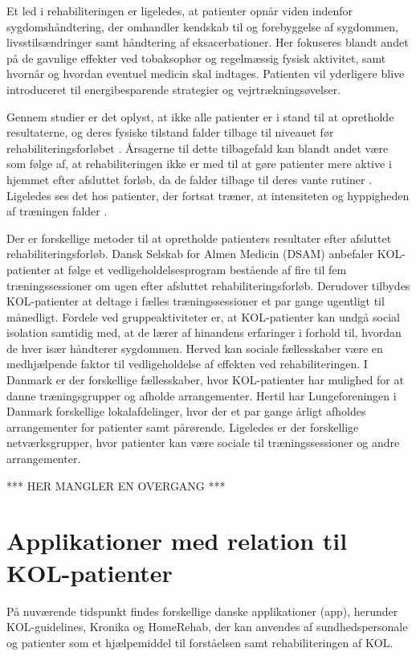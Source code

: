 Et led i rehabiliteringen er ligeledes, at patienter opnår viden indenfor sygdomshåndtering, der omhandler kendskab til og forebyggelse af sygdommen, livsstilsændringer samt håndtering af eksacerbationer.\cite{McCarthy2015,Sundhedsstyrelsen2015} Her fokuseres blandt andet på de gavnlige effekter ved tobaksophør og regelmæssig fysisk aktivitet, samt hvornår og hvordan eventuel medicin skal indtages. Patienten vil yderligere blive introduceret til energibesparende strategier og vejrtrækningsøvelser.\cite{McCarthy2015,Sundhedsstyrelsen2015}    

Gennem studier er det oplyst, at ikke alle patienter er i stand til at opretholde resultaterne, og deres fysiske tilstand falder tilbage til niveauet før rehabiliteringsforløbet \cite{Egan2012,Beachamp2013,Zanaboni2017,Ringbaek2008}. 
Årsagerne til dette tilbagefald kan blandt andet være som følge af, at rehabiliteringen ikke er med til at gøre patienter mere aktive i hjemmet efter afsluttet forløb, da de falder tilbage til deres vante rutiner \cite{Egan2012}. Ligeledes ses det hos patienter, der fortsat træner, at intensiteten og hyppigheden af træningen falder \cite{Ringbaek2008}. 

Der er forskellige metoder til at opretholde patienters resultater efter afsluttet rehabiliteringsforløb. Dansk Selskab for Almen Medicin (DSAM) anbefaler KOL-patienter at følge et vedligeholdelsesprogram bestående af fire til fem træningssessioner om ugen efter afsluttet rehabiliteringsforløb. Derudover tilbydes  KOL-patienter at deltage i fælles træningssessioner et par gange ugentligt til månedligt.\cite{dsam2016}
Fordele ved gruppeaktiviteter er, at KOL-patienter kan undgå social isolation samtidig med, at de lærer af hinandens erfaringer i forhold til, hvordan de hver især håndterer sygdommen. Herved kan sociale fællesskaber være en medhjælpende faktor til vedligeholdelse af effekten ved rehabiliteringen.\cite{dsam2016} I Danmark er der forskellige fællesskaber, hvor KOL-patienter har mulighed for at danne træningsgrupper og afholde arrangementer.\cite{Sundhedsstyrelsen2015} Hertil har Lungeforeningen i Danmark forskellige lokalafdelinger, hvor der et par gange årligt afholdes arrangementer for patienter samt pårørende. Ligeledes er der forskellige netværksgrupper, hvor patienter kan være sociale til træningssessioner og andre arrangementer.\cite{Lungeforeningen2016}

*** HER MANGLER EN OVERGANG ***

\section{Applikationer med relation til KOL-patienter}
På nuværende tidspunkt findes forskellige danske applikationer (app), herunder KOL-guidelines, Kronika og HomeRehab, der kan anvendes af  sundhedspersonale og patienter som et hjælpemiddel til forståelsen samt rehabiliteringen af KOL.\cite{KOLguidelines2012,Kronika2014,HealthcareDenmark2017} 

